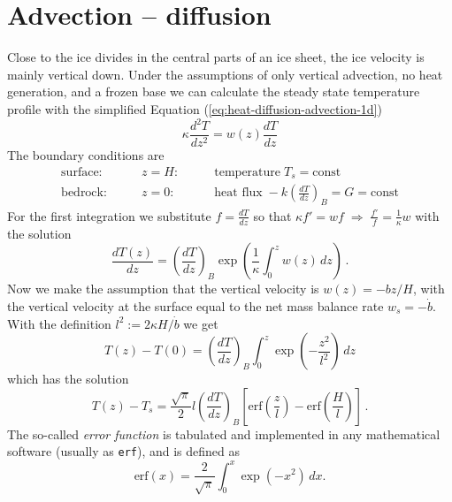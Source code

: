 \documentclass[parskip=half]{scrartcl}
\begin{document}
\section{Advection -- diffusion}
\label{sec:advection-diffusion}

Close to the ice divides in the central parts of an ice sheet, the ice
velocity is mainly vertical down.  Under the assumptions of only vertical
advection, no heat generation, and a frozen base we can calculate the steady
state temperature profile with the simplified Equation
(\ref{eq:heat-diffusion-advection-1d})
%
\begin{equation}
 \label{eq:heat-diffusion-advection-1d-steady}
 \kappa \frac{d^2T}{d z^2} =  w(z) \frac{d T}{d z}
\end{equation}
%
The boundary conditions are
\begin{align*}
 \text{surface:} \qquad & z=H: &\qquad \text{temperature}\;T_s = \text{const}\\
 \text{bedrock:} \qquad & z=0: &\qquad \text{heat flux}\;-k \left(\frac{dT}{dz}\right)_{B} = G
 = \text{const}
\end{align*}
%
For the first integration we substitute $f = \frac{dT}{dz}$ so that $\kappa f'
= wf \; \Longrightarrow \; \frac{f' }{f} = \frac{1}{\kappa} w$ with the
solution
%
\begin{equation}
 \label{eq:8}
 \frac{dT(z)}{dz} = \left(\frac{dT}{dz}\right)_{B}  \exp \left( \frac{1}{\kappa} \int_0^z w(z)\, dz \right)\,.
\end{equation}
%
Now we make the assumption that the vertical velocity is $w(z) = -b z/H$, with
the vertical velocity at the surface equal to the net mass balance rate $w_{s}
= -\dot{b}$.  With the definition $l^2 := 2\kappa H /\dot{b}$ we get
%
\begin{equation}
 \label{eq:10}
 T(z) - T(0) = \left(\frac{dT}{dz}\right)_{B}  \int_0^z \exp \left(-\frac{z^2}{l^2}   \right) \,dz
\end{equation}
%
which has the solution
%
\begin{equation}
 \label{eq:11}
 T(z) - T_s = \frac{\sqrt\pi}{2} l \left(\frac{dT}{dz}\right)_{B} 
 \left[ {\textrm{erf}} \left( \frac{z}{l} \right) - {\textrm{erf}} \left( \frac{H}{l} \right) \right]\,.
\end{equation}
%
The so-called \emph{error function} is tabulated and implemented in any
mathematical software (usually as \texttt{erf}), and is defined as
%
\begin{equation*}
 \label{eq:12}
 {\textrm{erf}}(x) = \frac{2}{\sqrt{\pi}} \int_0^x \exp(-x^2) \, dx.
\end{equation*}
\end{document}
